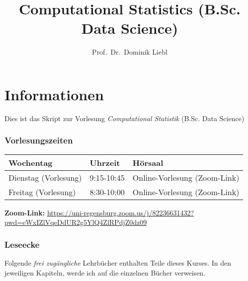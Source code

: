 \documentclass[
  ngerman,
]{book}
\title{Computational Statistics (B.Sc. Data Science)}
\author{Prof.~Dr.~Dominik Liebl}
\date{}
\begin{document}
\maketitle

{
\setcounter{tocdepth}{1}
\tableofcontents
}
\hypertarget{informationen}{%
\chapter*{Informationen}\label{informationen}}

Dies ist das Skript zur Vorlesung \emph{Computational Statistik} (B.Sc. Data Science)

\hypertarget{vorlesungszeiten}{%
\subsection*{Vorlesungszeiten}\label{vorlesungszeiten}}

\begin{table}[H]
\centering
\begin{tabular}[t]{l|l|l}
\hline
Wochentag & Uhrzeit & Hörsaal\\
\hline
Dienstag (Vorlesung) & 9:15-10:45 & Online-Vorlesung (Zoom-Link)\\
\hline
Freitag (Vorlesung) & 8:30-10:00 & Online-Vorlesung (Zoom-Link)\\
\hline
\end{tabular}
\end{table}

\textbf{Zoom-Link:} \url{https://uni-regensburg.zoom.us/j/82236631432?pwd=eWxIZlVqeDdUR2g5YlQ4ZlRPdjZ0dz09}

\hypertarget{leseecke}{%
\subsection*{Leseecke}\label{leseecke}}

Folgende \emph{frei zugängliche} Lehrbücher enthalten Teile dieses Kurses. In den jeweiligen Kapiteln, werde ich auf die einzelnen Bücher verweisen.
\end{document}
